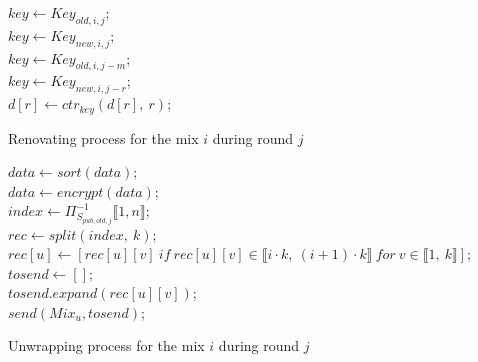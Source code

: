 \documentclass[USenglish,oneside,twocolumn]{article}
\begin{document}
\begin{algorithm}
\DontPrintSemicolon
{}
$key \gets Key_{old,i,j}$;\\
{
	$key \gets Key_{new,i,j}$;\\
}
{
	$key \gets Key_{old,i,j-m}$;\\
}
\uElse
{
	$key \gets Key_{new,i,j-r}$;\\
}
{
	$d[r] \gets ctr_{key}\left (d[r],\ r\right )$;\\
}
\caption{Renovating process for the mix $i$ during round $j$}
\label{alg:renov}
\end{algorithm}

\begin{algorithm}
\DontPrintSemicolon
{}
$data \gets sort(data)$;\\
$data \gets encrypt(data)$;\\

$index \gets {\Pi}^{-1}_{S_{pub,old,j}} \llbracket 1,n \rrbracket$;\\
$rec \gets split(index,\ k)$;\\
{
	$rec[u] \gets [rec[u][v]\ if\ rec[u][v] \in \llbracket i\cdot k,\ (i+1) \cdot k \rrbracket\ for\  v \in \llbracket 1,\ k \rrbracket]$;\\
}
{
	$tosend \gets []$;\\
	{
		$tosend.expand(rec[u][v])$;\\
	}
	$send(Mix_u, tosend)$;\\
}
\caption{Unwrapping process for the mix $i$ during round $j$}
\label{alg:UAS}
\end{algorithm}
\end{document}
